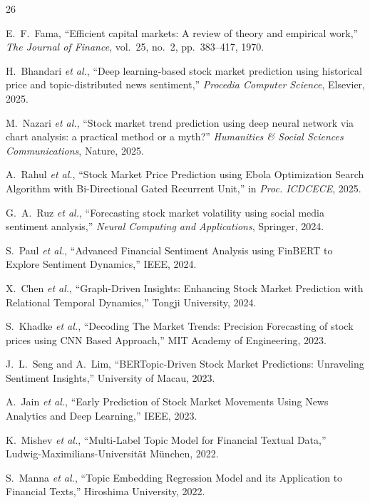 \documentclass[11pt]{article}
\begin{document}

\begin{thebibliography}{26}

E.~F.~Fama, ``Efficient capital markets: A review of theory and empirical work,'' \textit{The Journal of Finance}, vol.~25, no.~2, pp.~383--417, 1970.

H.~Bhandari \textit{et al.}, ``Deep learning-based stock market prediction using historical price and topic-distributed news sentiment,'' \textit{Procedia Computer Science}, Elsevier, 2025.

M.~Nazari \textit{et al.}, ``Stock market trend prediction using deep neural network via chart analysis: a practical method or a myth?'' \textit{Humanities \& Social Sciences Communications}, Nature, 2025.

A.~Rahul \textit{et al.}, ``Stock Market Price Prediction using Ebola Optimization Search Algorithm with Bi-Directional Gated Recurrent Unit,'' in \textit{Proc. ICDCECE}, 2025.

G.~A.~Ruz \textit{et al.}, ``Forecasting stock market volatility using social media sentiment analysis,'' \textit{Neural Computing and Applications}, Springer, 2024.

S.~Paul \textit{et al.}, ``Advanced Financial Sentiment Analysis using FinBERT to Explore Sentiment Dynamics,'' IEEE, 2024.

X.~Chen \textit{et al.}, ``Graph-Driven Insights: Enhancing Stock Market Prediction with Relational Temporal Dynamics,'' Tongji University, 2024.

S.~Khadke \textit{et al.}, ``Decoding The Market Trends: Precision Forecasting of stock prices using CNN Based Approach,'' MIT Academy of Engineering, 2023.

J.~L.~Seng and A.~Lim, ``BERTopic-Driven Stock Market Predictions: Unraveling Sentiment Insights,'' University of Macau, 2023.

A.~Jain \textit{et al.}, ``Early Prediction of Stock Market Movements Using News Analytics and Deep Learning,'' IEEE, 2023.

K.~Mishev \textit{et al.}, ``Multi-Label Topic Model for Financial Textual Data,'' Ludwig-Maximilians-Universit\"{a}t M\"{u}nchen, 2022.

S.~Manna \textit{et al.}, ``Topic Embedding Regression Model and its Application to Financial Texts,'' Hiroshima University, 2022.


\end{thebibliography}
\end{document}
